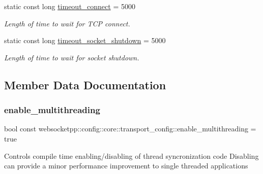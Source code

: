 \begin{DoxyCompactItemize}
\mbox{\label{structwebsocketpp_1_1config_1_1core_1_1transport__config_a7f1a37fc314fd8a5f649bef00ab77987}} 
static const long \mbox{\hyperlink{structwebsocketpp_1_1config_1_1core_1_1transport__config_a7f1a37fc314fd8a5f649bef00ab77987}{timeout\+\_\+connect}} = 5000
\begin{DoxyCompactList}\small\item\em Length of time to wait for T\+CP connect. \end{DoxyCompactList}\item 
\mbox{\label{structwebsocketpp_1_1config_1_1core_1_1transport__config_a185b7787fb2ee6bdf8ae5391926b1665}} 
static const long \mbox{\hyperlink{structwebsocketpp_1_1config_1_1core_1_1transport__config_a185b7787fb2ee6bdf8ae5391926b1665}{timeout\+\_\+socket\+\_\+shutdown}} = 5000
\begin{DoxyCompactList}\small\item\em Length of time to wait for socket shutdown. \end{DoxyCompactList}\end{DoxyCompactItemize}


\subsection{Member Data Documentation}
\mbox{\label{structwebsocketpp_1_1config_1_1core_1_1transport__config_aec8759f2af401067ca30c3c36ec36346}} 
\subsubsection{\texorpdfstring{enable\+\_\+multithreading}{enable\_multithreading}}
{\footnotesize\ttfamily bool const websocketpp\+::config\+::core\+::transport\+\_\+config\+::enable\+\_\+multithreading = true\hspace{0.3cm}{\ttfamily [static]}}

Controls compile time enabling/disabling of thread syncronization code Disabling can provide a minor performance improvement to single threaded applications \mbox{\label{structwebsocketpp_1_1config_1_1core_1_1transport__config_aed4eae8f2370c532a05e51a2f006fc71}} 
